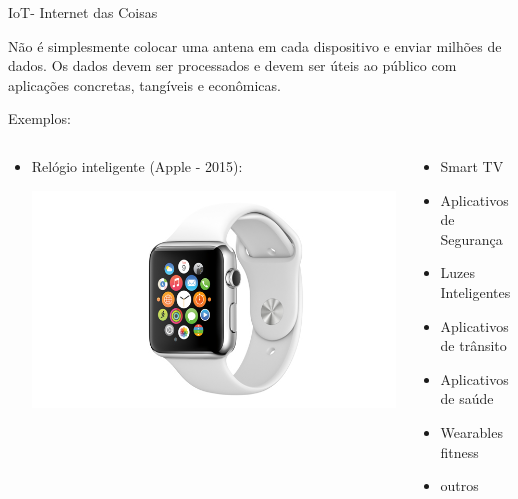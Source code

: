 \documentclass{beamer}
\begin{document}
\begin{frame}{IoT- Internet das Coisas }

\begin{alertblock}{}
 Não é simplesmente colocar uma antena em cada dispositivo e enviar milhões de dados. Os dados devem ser processados e devem ser úteis ao público com aplicações concretas, tangíveis e econômicas.
 \end{alertblock} 
 Exemplos:
 \begin{columns}
\begin{column}{0.55\textwidth}
\begin{itemize}
 \item Relógio inteligente (Apple - 2015): 
 
 \includegraphics[width=.81\textwidth]{img/applewatch.jpg}
\end{itemize}
\end{column}
\begin{column}{0.45\textwidth}
\begin{itemize}
 \item Smart TV
 \item Aplicativos de Segurança
 \item Luzes Inteligentes
 \item Aplicativos de trânsito
 \item Aplicativos de saúde
 \item Wearables fitness
 \item outros
\end{itemize}
\end{column}
\end{columns}


\end{frame}
\end{document}
